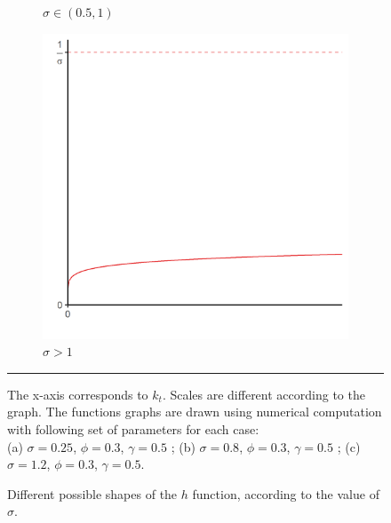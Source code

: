 \begin{figure}[tb]
\begin{subfigure}[t]{0.32\linewidth}
		\caption{$\sigma \in \left(0.5, 1\right)$} 
		\label{fig:h_shape_2} 
	\end{subfigure}
	\begin{subfigure}[t]{0.32\linewidth}
		\centering
		\includegraphics[width=1\linewidth]{../result/appendix_A/function_h/graph_3.png} 
		\caption{$\sigma > 1$} 
		\label{fig:h_shape_3} 
	\end{subfigure} 
	\caption{Different possible shapes of the $h$ function, according to the value of $\sigma$.}
	\label{fig:h_shape}
	\vspace{.5ex}
	\hrule
	\vspace{-4ex}
	\justify\singlespacing\footnotesize The x-axis corresponds to $k_t$. Scales are different according to the graph. The functions graphs are drawn using numerical computation with following set of parameters for each case:\\
	(a) $\sigma = 0.25$, $\phi = 0.3$, $\gamma = 0.5$ ; \hspace{4ex}(b) $\sigma = 0.8$, $\phi = 0.3$, $\gamma = 0.5$ ; \hspace{4ex}(c) $\sigma = 1.2$, $\phi = 0.3$, $\gamma = 0.5$.
\end{figure}


